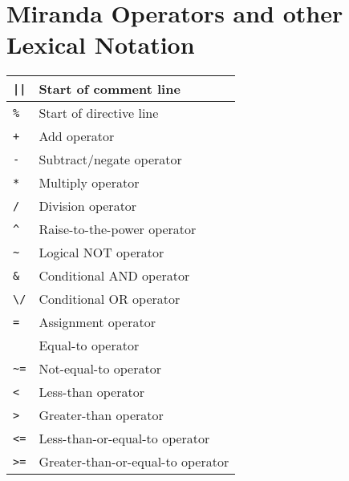 \documentclass[]{article}
\begin{document}
\section*{Miranda Operators and other Lexical Notation}

\centering
\begin{tabular}{ | l | l | }
	\hline
	\texttt{||}                     & Start of comment line                             \\ \hline	
	\texttt{\%}                     & Start of directive line                           \\ \hline
	\hline
	\texttt{+}                      & Add operator                                      \\ \hline
	\texttt{-}                      & Subtract/negate operator                          \\ \hline
	\texttt{*}                      & Multiply operator                                 \\ \hline
	\texttt{/}                      & Division operator                                 \\ \hline
	\texttt{\^{}}                   & Raise-to-the-power operator                       \\ \hline
	\hline
	\texttt{\textasciitilde}        & Logical NOT operator                              \\ \hline
	\texttt{\&}                     & Conditional AND operator                          \\ \hline
	\texttt{\textbackslash/}        & Conditional OR operator                           \\ \hline
	\hline
	\texttt{=}                      & Assignment operator                               \\ 
	                                & Equal-to operator                                 \\ \hline
	\texttt{\textasciitilde=}       & Not-equal-to operator                             \\ \hline
	\texttt{<}                      & Less-than operator                                \\ \hline
	\texttt{>}                      & Greater-than operator                             \\ \hline
	\texttt{<=}                     & Less-than-or-equal-to operator                    \\ \hline
	\texttt{>=}                     & Greater-than-or-equal-to operator                 \\ \hline

\end{tabular}
\end{document}
